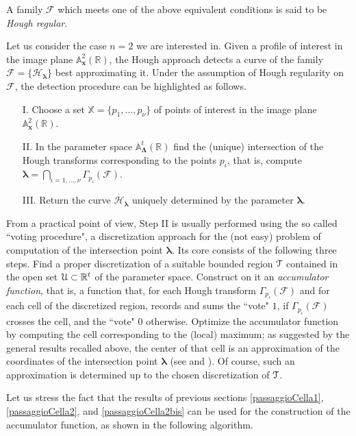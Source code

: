 \documentclass[10pt]{article}
\newcommand\sT{{\cal T}}
\newcommand\sU{{\cal U}}
\newcommand\reals{{\mathbb R}}
\newcommand{\x}{{\bm x}}
\newcommand\R{{\mathbb R}}
\begin{document}
{A family $\mathcal{F}$ which meets one of the above equivalent conditions is said to be
 {\em Hough regular}.

 \smallskip

Let us consider the case $n=2$ we are interested in. Given a profile of interest in the image plane ${\mathbb A}_{\x}^2(\R)$, 
the Hough approach detects a curve of the family $\mathcal F=\{\mathcal{H}_{\bm \lambda}\}$ 
 best approximating it. 
Under the assumption of Hough regularity on $\mathcal F$, the  
detection procedure can be  highlighted as follows. 
\begin{enumerate}
\item[I.] Choose  a set $\mathbb X = \{p_1,\ldots,p_\nu\}$ of points of interest  in the image plane $ {\mathbb A}_{\x}^2(\reals)$.
\item[II.] In the parameter space ${\mathbb A}_{\bm \Lambda}^t(\R)$ 
find the (unique) intersection of the Hough transforms corresponding 
to the points $p_\iota$, that is, compute
${\bm \lambda} = \bigcap_{\iota=1,\ldots,\nu} \Gamma_{p_\iota}(\mathcal F)$. 
\item[III.] Return the  curve ${\mathcal H}_{\bm \lambda}$ uniquely determined by the parameter ${\bm \lambda}$.
\end{enumerate}

From a practical point of view, Step II is usually performed using the 
so called ``voting procedure", a discretization  approach for the (not easy) problem 
of computation of the intersection point ${\bm \lambda}$. 
Its core consists of the following three steps. Find a proper discretization of a suitable bounded 
region $\sT $ contained in the  open set  $\sU\subset \R^t$
 of the parameter space. Construct on it an {\em accumulator function}, that is,  
 a function that, for each Hough transform  $\Gamma_{p_\iota}(\mathcal F)$ and for each cell 
of the discretized region, records and sums the ``vote" $1$, if $\Gamma_{p_\iota}(\mathcal F)$ 
crosses the cell, and the ``vote" $0$ otherwise.   
Optimize the accumulator function by computing the cell corresponding to the (local) maximum; as suggested by the general results  
 recalled above, the center of that cell is an  approximation of the coordinates of the intersection point ${\bm \lambda}$ (see \cite[Section 6]{BMP} and \cite[Section 4]{etal}). 
Of course, such an approximation  is determined up to the chosen discretization of   $\sT $.

Let us stress the fact  that  the results of previous sections \ref{passaggioCella1}, 
\ref{passaggioCella2}, and \ref{passaggioCella2bis} can be used for the construction 
of the accumulator function, as shown in the following algorithm.

}
\end{document}
